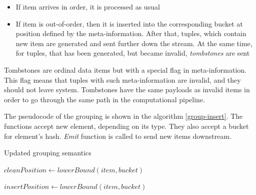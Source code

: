 \begin{itemize}
    \item If item arrives in order, it is processed as usual
    \item If item is out-of-order, then it is inserted into the corresponding bucket at position defined by the meta-information. After that, tuples, which contain new item are generated and sent further down the stream. At the same time, for tuples, that has been generated, but became invalid, {\it tombstones} are sent
\end{itemize}

Tombstones are ordinal data items but with a special flag in meta-information. This flag means that tuples with such meta-information are invalid, and they should not leave system. Tombstones have the same payloads as invalid items in order to go through the same path in the computational pipeline.

The pseudocode of the grouping is shown in the algorithm \ref{group-insert}. The functions accept new element, depending on its type. They also accept a bucket for element's hash. {\it Emit} function is called to send new items downstream.

\begin{algorithm}
\caption{Updated grouping semantics}
\label{group-insert}
  \begin{algorithmic}[1]
      \State $cleanPosition \gets lowerBound(item, bucket)$
        \State {}
      \EndFor

      \State {}

        \State {} 
      \EndFor
    \EndFunction

    \State

      \State $insertPosition \gets lowerBound(item, bucket)$
        \State {} 
      \EndFor
      
      \State {}

        \State {} 
      \EndFor
    \EndFunction
  \end{algorithmic}
\end{algorithm}


